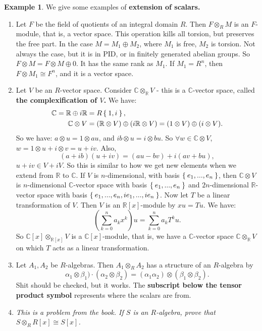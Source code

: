 \documentclass[12pt]{amsbook}
\theoremstyle{plain}
\numberwithin{section}{chapter}
\numberwithin{equation}{chapter}
\theoremstyle{definition}
\newtheorem{Ex}[theorem]{Example}
\theoremstyle{remark}
\newcommand{\R}{\mathbb{R}}
\renewcommand{\c}{\mathbb{C}}
\newcommand{\bee}{\begin{equation}\begin{aligned}}
\newcommand{\eee}{\end{aligned}\end{equation}}
\newcommand{\tens}{\otimes}
\begin{document}
\begin{Ex}
We give some examples of \textbf{extension of scalars. }

\begin{enumerate}
\item Let $F$ be the field of quotients of an integral domain $R$. Then $F \tens_R M$ is an $F$-module, that is, a vector space. This operation kills all torsion, but preserves the free part. In the case $M = M_1 \oplus M_2$, where $M_1$ is free, $M_2$ is torsion. Not always the case, but it is in PID, or in finitely generated abelian groups. So $F \tens M = F \tens M \oplus 0$. It has the same rank as $M_1$. If $M_1 = R^n$, then $F \tens M_1 \cong F^n$, and it is a vector space. 

\item Let $V$ be an $R$-vector space. Consider $\c \tens_\R V$ - this is a $\c$-vector space, called \textbf{the complexification of $V$.} We have: 
\bee
\c = \R \oplus i\R &= R \Set{1,i},\\
\c \tens V &= (\R \tens V) \oplus (i\R \tens V) = (1 \tens V) \oplus (i \tens V).
\eee
So we have: $a \tens u = 1 \tens au$, and $ib \tens u = i \tens bu$. So $\forall w \in \c \tens V$, $w = 1 \tens u + i \tens v = u + iv$. Also, 
$$
(a + ib)(u + iv) = (au - bv) + i(av + bu),
$$
$u + iv \in V + iV$. So this is similar to how we get new elements when we extend from $\R$ to $\c$. If $V$ is $n$-dimensional, with basis $\Set{e_1,...,e_n}$, then $\c \tens V$ is $n$-dimensional $\c$-vector space with basis $\Set{e_1,...,e_n}$ and $2n$-dimensional $\R$-vector space with basis $\Set{e_1,...,e_n,ie_1,...,ie_n}$. Now let $T$ be a linear transformation of $V$. Then $V$ is an $\R[x]$-module by $xu = Tu$. We have: 
$$
\left( \sum_{k = 0}^n a_k x^k\right) u = \sum_{k = 0}^n a_kT^ku.
$$
So $\c[x] \tens_{\R[x]} V$ is a $\c[x]$-module, that is, we have a $\c$-vector space $\c \tens_\R V$ on which $T$ acts as a linear transformation. 

\item Let $A_1,A_2$ be $R$-algebras. Then $A_1 \tens_R A_2$ has a structure of an $R$-algebra by 
$$
\alpha_1 \tens \beta_1) \cdot (\alpha_2 \tens \beta_2) = (\alpha_1\alpha_2)\tens(\beta_1\tens \beta_2).
$$
Shit should be checked, but it works. The \textbf{subscript below the tensor product symbol} represents where the scalars are from. 

\item \textit{This is a problem from the book. If $S$ is an $R$-algebra, prove that $S \tens_R R[x] \cong S[x]$. }


\end{enumerate}
\end{Ex}
\end{document}
